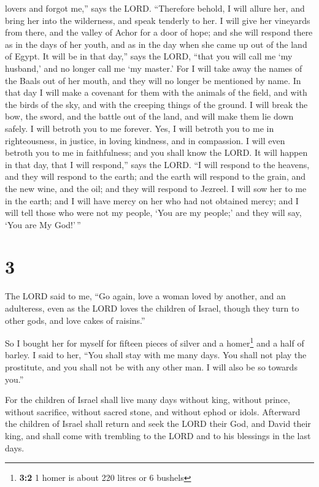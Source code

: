 lovers and forgot me,'' says the LORD.  ``Therefore
behold, I will allure her, and bring her into the wilderness, and speak
tenderly to her.  I will give her vineyards from there,
and the valley of Achor for a door of hope; and she will respond there
as in the days of her youth, and as in the day when she came up out of
the land of Egypt.  It will be in that day,'' says the
LORD, ``that you will call me `my husband,' and no longer call me `my
master.'  For I will take away the names of the Baals out
of her mouth, and they will no longer be mentioned by name.
 In that day I will make a covenant for them with the
animals of the field, and with the birds of the sky, and with the
creeping things of the ground. I will break the bow, the sword, and the
battle out of the land, and will make them lie down safely.
 I will betroth you to me forever. Yes, I will betroth
you to me in righteousness, in justice, in loving kindness, and in
compassion.  I will even betroth you to me in
faithfulness; and you shall know the LORD.  It will
happen in that day, that I will respond,'' says the LORD. ``I will
respond to the heavens, and they will respond to the earth;
 and the earth will respond to the grain, and the new
wine, and the oil; and they will respond to Jezreel.  I
will sow her to me in the earth; and I will have mercy on her who had
not obtained mercy; and I will tell those who were not my people, `You
are my people;' and they will say, `You are My God!'\,''

\hypertarget{section-2}{%
\section{3}\label{section-2}}

 The LORD said to me, ``Go again, love a woman loved by
another, and an adulteress, even as the LORD loves the children of
Israel, though they turn to other gods, and love cakes of raisins.''

 So I bought her for myself for fifteen pieces of silver
and a homer\footnote{\textbf{3:2} 1 homer is about 220 litres or 6
  bushels} and a half of barley.  I said to her, ``You
shall stay with me many days. You shall not play the prostitute, and you
shall not be with any other man. I will also be so towards you.''

 For the children of Israel shall live many days without
king, without prince, without sacrifice, without sacred stone, and
without ephod or idols.  Afterward the children of Israel
shall return and seek the LORD their God, and David their king, and
shall come with trembling to the LORD and to his blessings in the last
days.

